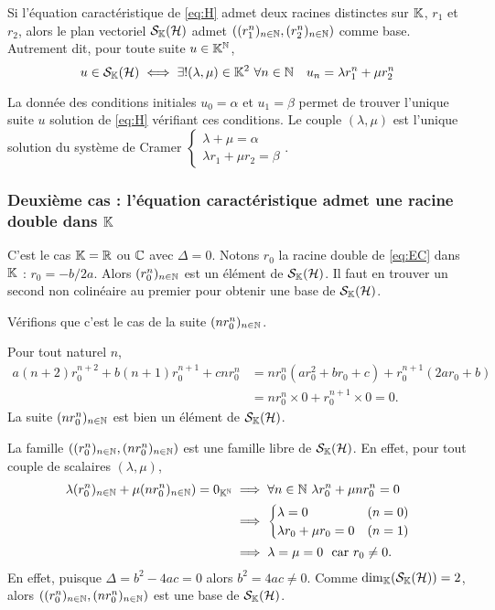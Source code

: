 \begin{theo}
  Si l'équation caractéristique de \eqref{eq:H} admet deux racines distinctes 
  sur \(\mathbb{K}\), \(r_1\) et \(r_2\), alors le plan vectoriel \(\mathcal{S}_{\mathbb{K}}(\mathcal{H})\) admet 
  \(((r_1^n)_{n \in \mathbb{N}},(r_2^n)_{n \in \mathbb{N}})\) comme base. Autrement dit, pour 
  toute suite \(u \in \mathbb{K}^{\mathbb{N}}\),
  \begin{equation}
    u \in \mathcal{S}_{\mathbb{K}}(\mathcal{H}) \iff \exists! (\lambda,\mu) \in \mathbb{K}^2 \ \forall n \in \mathbb{N} 
    \quad u_n = \lambda r_1^n +\mu r_2^n
  \end{equation}
\end{theo}

La donnée des conditions initiales \(u_0=\alpha\) et \(u_1=\beta\) permet de 
trouver l'unique suite \(u\) solution de \eqref{eq:H} vérifiant ces conditions. 
Le couple \((\lambda, \mu)\) est l'unique solution du système de Cramer 
\(\begin{cases} \lambda + \mu =\alpha \\ \lambda r_1+\mu r_2 =\beta 
\end{cases}\).

\subsubsection{Deuxième cas : l'équation caractéristique admet une racine double 
dans \(\mathbb{K}\)}

C'est le cas \(\mathbb{K}=\mathbb{R}\) ou \(\mathbb{C}\) avec \(\Delta=0\). Notons \(r_0\) la racine 
double de \eqref{eq:EC} dans \(\mathbb{K}\) : \(r_0 = -b/2a\). Alors \((r_0^n)_{n \in 
\mathbb{N}}\) est un élément de \(\mathcal{S}_{\mathbb{K}}(\mathcal{H})\). Il faut en trouver un second non 
colinéaire au premier pour obtenir une base de \(\mathcal{S}_{\mathbb{K}}(\mathcal{H})\).

Vérifions que c'est le cas de la suite \((nr_0^n)_{n \in \mathbb{N}}\).

Pour tout naturel \(n\),
\begin{align}
  a(n+2)r_0^{n+2} +b(n+1)r_0^{n+1} +cnr_0^n &= nr_0^n(ar_0^2+br_0+c) 
  +r_0^{n+1}(2ar_0+b)\\
  &= nr_0^n \times 0 + r_0^{n+1} \times 0 =0.
\end{align}
La suite \((nr_0^n)_{n \in \mathbb{N}}\) est bien un élément de \(\mathcal{S}_{\mathbb{K}}(\mathcal{H})\).

La famille \(((r_0^n)_{n \in \mathbb{N}},(nr_0^n)_{n \in \mathbb{N}})\) est une famille libre de 
\(\mathcal{S}_{\mathbb{K}}(\mathcal{H})\). En effet, pour tout couple de scalaires \((\lambda,\mu)\),
\begin{align}
  \lambda (r_0^n)_{n \in \mathbb{N}} + \mu (nr_0^n)_{n \in \mathbb{N}}) = 0_{\mathbb{K}^{\mathbb{N}}} &\implies 
  \forall n \in \mathbb{N} \ \lambda r_0^n +\mu n r_0^n = 0\\
  &\implies \begin{cases} \lambda =0 & (n=0) \\ \lambda r_0 +\mu r_0 =0 & (n=1) 
  \end{cases}\\
  &\implies \lambda=\mu=0 \ \text{~car } r_0 \neq 0.
\end{align}
En effet, puisque \(\Delta = b^2-4ac=0\) alors \(b^2 = 4ac \neq 0\). Comme 
\(\dim_{\mathbb{K}}(\mathcal{S}_{\mathbb{K}}(\mathcal{H}))=2\), alors \(((r_0^n)_{n \in \mathbb{N}},(nr_0^n)_{n \in \mathbb{N}})\) est 
une base de \(\mathcal{S}_{\mathbb{K}}(\mathcal{H})\).

